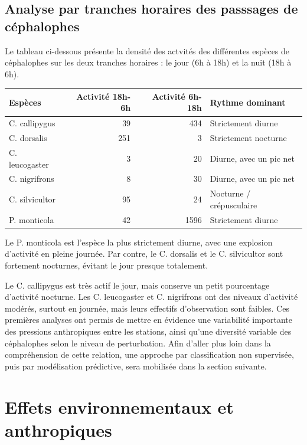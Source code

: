 \documentclass[
]{book}
\begin{document}
\subsection{Analyse par tranches horaires des passsages de céphalophes}\label{analyse-par-tranches-horaires-des-passsages-de-cuxe9phalophes}

Le tableau ci-dessous présente la densité des actvités des différentes espèces de céphalophes sur les deux tranches horaires : le jour (6h à 18h) et la nuit (18h à 6h).

\begin{tabular}{l|r|r|l}
\hline
Espèces & Activité 18h-6h & Activité 6h-18h & Rythme dominant\\
\hline
C. callipygus & 39 & 434 & Strictement diurne\\
\hline
C. dorsalis & 251 & 3 & Strictement nocturne\\
\hline
C. leucogaster & 3 & 20 & Diurne, avec un pic net\\
\hline
C. nigrifrons & 8 & 30 & Diurne, avec un pic net\\
\hline
C. silvicultor & 95 & 24 & Nocturne / crépusculaire\\
\hline
P. monticola & 42 & 1596 & Strictement diurne\\
\hline
\end{tabular}

Le P. monticola est l'espèce la plus strictement diurne, avec une explosion d'activité en pleine journée. Par contre, le C. dorsalis et le C. silvicultor sont fortement nocturnes, évitant le jour presque totalement.

Le C. callipygus est très actif le jour, mais conserve un petit pourcentage d'activité nocturne. Les C. leucogaster et C. nigrifrons ont des niveaux d'activité modérés, surtout en journée, mais leurs effectifs d'observation sont faibles.
Ces premières analyses ont permis de mettre en évidence une variabilité importante des pressions anthropiques entre les stations, ainsi qu'une diversité variable des céphalophes selon le niveau de perturbation. Afin d'aller plus loin dans la compréhension de cette relation, une approche par classification non supervisée, puis par modélisation prédictive, sera mobilisée dans la section suivante.

\section{Effets environnementaux et anthropiques}\label{effets-environnementaux-et-anthropiques}
\end{document}
